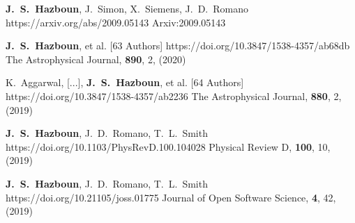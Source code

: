          {\textbf{J.~S.~Hazboun}, J.~{Simon}, X.~{Siemens}, J.~D.~{Romano}}
         {https://arxiv.org/abs/2009.05143}
         {{Arxiv:}2009.05143}

         {\textbf{J.~S.~{Hazboun}}, et al. [63 Authors]}
         {https://doi.org/10.3847/1538-4357/ab68db}
         {{The Astrophysical Journal}, \textbf{890}, 2, (2020)}

         {K.~{Aggarwal}, [...], \textbf{J.~S.~{Hazboun}}, et al. [64 Authors]}
         {https://doi.org/10.3847/1538-4357/ab2236}
         {{The Astrophysical Journal}, \textbf{880}, 2, (2019)}

         {\textbf{J.~S.~Hazboun}, J.~D.~{Romano}, T.~L.~{Smith}}
         {https://doi.org/10.1103/PhysRevD.100.104028}
         {{Physical Review D}, \textbf{100}, 10, (2019)}

         {\textbf{J.~S.~Hazboun}, J.~D.~{Romano}, T.~L.~{Smith}}
         {https://doi.org/10.21105/joss.01775}
         {{Journal of Open Software Science}, \textbf{4}, 42, (2019)}

